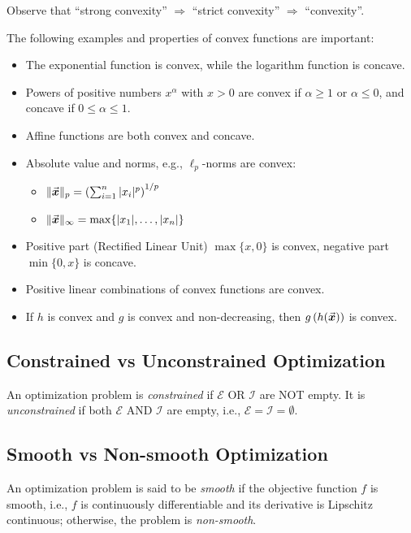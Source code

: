 Observe that ``strong convexity'' $\Longrightarrow$ ``strict convexity'' $\Longrightarrow$ ``convexity''.

\begin{example}\label{ex:convex_functions}
The following examples and properties of convex functions are important:
\begin{itemize}
\item The exponential function is convex, while the logarithm function is concave. 
\item Powers of positive numbers $x^{\alpha}$ with $x>0$ are convex if $\alpha \geq 1$ or $\alpha \leq 0$, and concave if $0 \leq \alpha \leq 1$.
\item Affine functions are both convex and concave.
\item Absolute value and norms, e.g., $\ell_p$-norms are convex:
\begin{itemize}
  \item $\| \vec{\boldsymbol{x}}\|_{p} = \left(\sum_{i=1}^{n}|x_{i}|^{p}\right)^{1/p}$
  \item $\| \vec{\boldsymbol{x}}\|_{\infty}=\max\{|x_{1}|,\dots,|x_{n}|\}$
\end{itemize}
\item Positive part (Rectified Linear Unit) $\max\{x, 0\}$ is convex, negative part $\min\{0,x\}$ is concave.
\item Positive linear combinations of convex functions are convex.
\item If \(h\) is convex and \(g\) is convex and non-decreasing, then \(g\left(h(\vec{\boldsymbol{x}})\right)\) is convex.\qedhere
\end{itemize}
\end{example}

\subsection{Constrained vs Unconstrained Optimization}

An optimization problem is \emph{constrained} if \(\mathcal{E}\) OR \(\mathcal{I}\) are NOT empty. It is \emph{unconstrained} if both \(\mathcal{E}\) AND \(\mathcal{I}\) are empty, i.e., \(\mathcal{E}=\mathcal{I}=\emptyset\).

\subsection{Smooth vs Non-smooth Optimization}
\label{subsec:smooth_non_smooth}
An optimization problem is said to be \emph{smooth} if the objective function \(f\) is smooth, i.e., $f$ is continuously differentiable and its derivative is Lipschitz continuous; otherwise, the problem is \emph{non-smooth}. 


